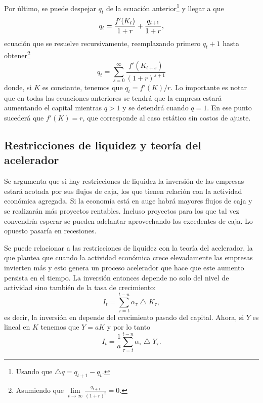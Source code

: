 \documentclass[DeGregorioResumen]{subfiles}
\begin{document}
Por último, se puede despejar $q_t$ de la ecuación anterior\footnote{Usando que $\bigtriangleup q=q_{t+1}-q_t$.} y llegar a que
\begin{equation*}
q_t=\frac{f'(K_t)}{1+r} + \frac{{q}_{t+1}}{1+r},
\end{equation*}
ecuación que se resuelve recursivamente, reemplazando primero $q_t+1$ hasta obtener\footnote{Asumiendo que $\underset{t \rightarrow \infty}{\lim}{\frac{q_{t+1}}{(1+r)^t}} = 0$.}
\begin{equation}
q_t=\sum_{s=0}^{\infty}{\frac{f'(K_{t+s})}{(1+r)^{s+1}}}
\end{equation}
donde, si $K$ es constante, tenemos que $q_t=f'(K)/r$. Lo importante es notar que en todas las ecuaciones anteriores  se tendrá que la empresa estará aumentando el capital mientras $q>1$ y se detendrá cuando $q=1$. En ese punto sucederá que $f'(K)=r$, que corresponde al caso estático sin costos de ajuste.

\subsection{Restricciones de liquidez y teoría del acelerador}

Se argumenta que si hay restricciones de liquidez la inversión de las empresas estará acotada por sus flujos de caja, los que tienen relación con la actividad económica agregada. Si la economía está en auge habrá mayores flujos de caja y se realizarán más proyectos rentables. Incluso proyectos para los que tal vez convendría esperar se pueden adelantar aprovechando los excedentes de caja. Lo opuesto pasaría en recesiones.

Se puede relacionar a las restricciones de liquidez con la teoría del acelerador, la que plantea que cuando la actividad económica crece elevadamente las empresas invierten más y esto genera un proceso acelerador que hace que este aumento persista en el tiempo. La inversión entonces depende no solo del nivel de actividad sino también de la tasa de crecimiento:
\begin{equation*}
I_t=\sum_{\tau=t}^{t-n}{\alpha_\tau\bigtriangleup K_\tau},
\end{equation*}
es decir, la inversión en depende del crecimiento pasado del capital. Ahora, si $Y$ es lineal en $K$ tenemos que $Y=aK$ y por lo tanto
\begin{equation}
I_t= \frac{1}{a}\sum_{\tau=t}^{t-n}{\alpha_\tau\bigtriangleup Y_\tau}.
\end{equation}
\end{document}
